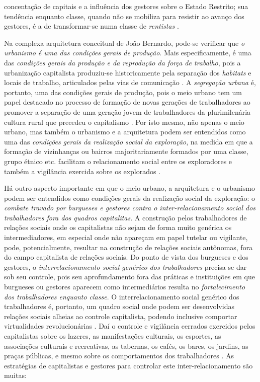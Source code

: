 concentação de capitais e a influência dos gestores sobre o Estado Restrito; sua tendência enquanto classe, quando não se mobiliza para resistir ao avanço dos gestores, é a de transformar-se numa classe de \textit{rentistas} \cite[p.~208-216]{BERNARDO1991}.

Na complexa arquitetura conceitual de João Bernardo, pode-se verificar que \textit{o urbanismo é uma das condições gerais de produção}. Mais especificamente, é uma das \textit{condições gerais da produção e da reprodução da força de trabalho}, pois a urbanização capitalista produziu-se historicamente pela separação dos \textit{habitats} e locais de trabalho, articulados pelas vias de comunicação \cite[p.~159]{BERNARDO1991}. A \textit{segregação urbana} é, portanto, uma das condições gerais de produção, pois o meio urbano tem um papel destacado no processo de formação de novas gerações de trabalhadores ao promover a separação de uma geração jovem de trabalhadores da plurimilenária cultura rural que precedeu o capitalismo \cite[p.~82-83]{BERNARDO1991}. Por isto mesmo, não apenas o meio urbano, mas também o urbanismo e a arquitetura podem ser entendidos como uma das \textit{condições gerais da realização social da exploração}, na medida em que a formação de vizinhanças ou bairros majoritariamente formados por uma classe, grupo étnico etc. facilitam o relacionamento social entre os exploradores e também a vigilância exercida sobre os explorados \cite[p.~160]{BERNARDO1991}. 

Há outro aspecto importante em que o meio urbano, a arquitetura e o urbanismo podem ser entendidos como condições gerais da realização social da exploração: o \textit{combate travado por burgueses e gestores contra o inter-relacionamento social dos trabalhadores fora dos quadros capitalitas}. A construção pelos trabalhadores de relações sociais onde os capitalistas não sejam de forma muito genérica os intermediadores, em especial onde não apareçam em papel tutelar ou vigilante, pode, potencialmente, resultar na construção de relações sociais autônomas, fora do campo capitalista de relações sociais. Do ponto de vista dos burgueses e dos gestores, o \textit{interrelacionamento social genérico dos trabalhadores} precisa se dar sob seu controle, pois seu aprofundamento fora das práticas e instituições em que burgueses ou gestores aparecem como intermediários resulta no \textit{fortalecimento dos trabalhadores enquanto classe}. O interrelacionamento social genérico dos trabalhadores é, portanto, um quadro social onde podem ser desenvolvidas relações sociais alheias ao controle capitalista, podendo inclusive comportar virtualidades revolucionárias \cite[p.~329]{BERNARDO1991}. Daí o controle e vigilância cerrados exercidos pelos capitalistas sobre os lazeres, as manifestações culturais, os esportes, as associações culturais e recreativas, as tabernas, os cafés, os bares, os jardins, as praças públicas, e mesmo sobre os comportamentos dos trabalhadores \cite[p.~317]{BERNARDO1991}. As estratégias de capitalistas e gestores para controlar este inter-relacionamento são muitas:

